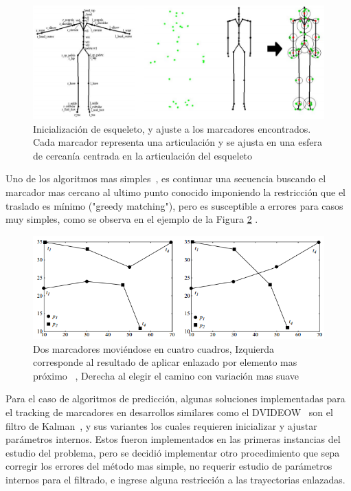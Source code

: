 \begin{figure}[hbt]
\begin{center}
\includegraphics[scale=0.5]{img/Tracking/01_skeleton_fitting_Herda.png}
\end{center}
\caption{Inicialización de esqueleto, y ajuste a los marcadores encontrados. Cada marcador representa una articulación y se ajusta en una esfera de cercanía centrada en la articulación del esqueleto}
\label{skeleton_fitting_herda}
\end{figure}

Uno de los algoritmos mas simples~\cite{survey_tracking}, es continuar una secuencia buscando el marcador mas cercano al ultimo punto conocido imponiendo la restricción que el traslado es mínimo ("greedy matching"), pero es susceptible a errores para casos muy simples, como se observa en el ejemplo de la Figura \ref{greedy_matching} .

\begin{figure}[hbt]
\begin{center}
\includegraphics[scale=0.8]{img/Tracking/01_Greedy_Matching.png}
\end{center}
\caption{Dos marcadores moviéndose en cuatro cuadros, Izquierda corresponde al resultado de aplicar enlazado por elemento mas próximo~\cite{survey_tracking} , Derecha al elegir el camino con variación mas suave}
\label{greedy_matching}
\end{figure}

Para el caso de algoritmos de predicción, algunas soluciones implementadas para el tracking de marcadores en desarrollos similares como el DVIDEOW~\cite{figueroa2003flexible} son el filtro de Kalman~\cite{kalman}, y sus variantes los cuales requieren inicializar y ajustar parámetros internos. Estos fueron implementados en las primeras instancias del estudio del problema, pero se decidió implementar otro procedimiento que sepa corregir los errores del método mas simple, no requerir estudio de parámetros internos para el filtrado, e ingrese alguna restricción a las trayectorias enlazadas.
\\ 

